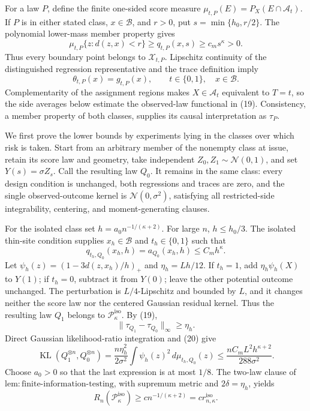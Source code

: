 For a law \(P\), define the finite one-sided score measure
\(\mu_{t,P}(E)=P_X(E\cap\mathcal A_t)\).  If \(P\) is in either stated
class, \(x\in\mathcal B\), and \(r>0\), put
\(s=\min\{h_0,r/2\}\).  The polynomial lower-mass member property gives
\[
 \mu_{t,P}\{z:d(z,x)<r\}\ge q_{t,P}(x,s)
 \ge c_ms^{\kappa}>0.
 \tag{18}
\]
Thus every boundary point belongs to \(\mathcal X_{t,P}\).  Lipschitz
continuity of the distinguished regression representative and the trace
definition imply
\[
 \theta_{t,P}(x)=g_{t,P}(x),
 \qquad t\in\{0,1\},\quad x\in\mathcal B.
 \tag{19}
\]
Complementarity of the assignment regions makes \(X\in\mathcal A_t\)
equivalent to \(T=t\), so the side averages below estimate the
observed-law functional in (19).  Consistency, a member property of both
classes, supplies its causal interpretation as \(\tau_P\).

We first prove the lower bounds by experiments lying in the classes over
which risk is taken.  Start from an arbitrary member of the nonempty class
at issue, retain its score law and geometry, take independent
\(Z_0,Z_1\sim\mathcal N(0,1)\), and set \(Y(s)=\sigma Z_s\).  Call the
resulting law \(Q_0\).  It remains in the same class: every design
condition is unchanged, both regressions and traces are zero, and the
single observed-outcome kernel is \(\mathcal N(0,\sigma^2)\), satisfying
all restricted-side integrability, centering, and moment-generating
clauses.

For the isolated class set \(h=a_0n^{-1/(\kappa+2)}\).  For large \(n\),
\(h\le h_0/3\).  The isolated thin-site condition supplies
\(x_h\in\mathcal B\) and \(t_h\in\{0,1\}\) such that
\[
 q_{t_h,Q_0}(x_h,h)=a_{Q_0}(x_h,h)\le C_mh^{\kappa}.
 \tag{20}
\]
Let \(\psi_h(z)=(1-3d(z,x_h)/h)_+\) and \(\eta_h=Lh/12\).  If
\(t_h=1\), add \(\eta_h\psi_h(X)\) to \(Y(1)\); if \(t_h=0\), subtract
it from \(Y(0)\); leave the other potential outcome unchanged.  The
perturbation is \(L/4\)-Lipschitz and bounded by \(L\), and it changes
neither the score law nor the centered Gaussian residual kernel.  Thus
the resulting law \(Q_1\) belongs to
\(\mathcal P_{\kappa}^{\mathrm{iso}}\).  By (19),
\[
 \|\tau_{Q_1}-\tau_{Q_0}\|_\infty\ge\eta_h.
 \tag{21}
\]
Direct Gaussian likelihood-ratio integration and (20) give
\[
 \operatorname{KL}(Q_1^{\otimes n},Q_0^{\otimes n})
 =\frac{n\eta_h^2}{2\sigma^2}
   \int\psi_h(z)^2\,d\mu_{t_h,Q_0}(z)
 \le\frac{nC_mL^2h^{\kappa+2}}{288\sigma^2}.
 \tag{22}
\]
Choose \(a_0>0\) so that the last expression is at most \(1/8\).  The
two-law clause of \(\mathrm{lem:finite\text{-}information\text{-}testing}\),
with supremum metric and \(2\delta=\eta_h\), yields
\[
 R_n(\mathcal P_{\kappa}^{\mathrm{iso}})
 \ge c n^{-1/(\kappa+2)}=c r_{n,\kappa}^{\mathrm{iso}}.
 \tag{23}
\]

